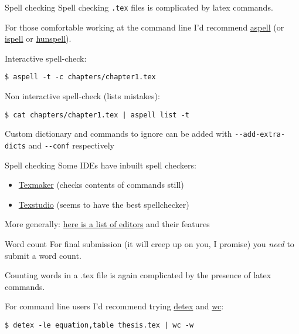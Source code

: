 \begin{frame}[fragile]{Spell checking}
  Spell checking \texttt{.tex} files is complicated by latex commands.

  For those comfortable working at the command line I'd recommend
  \href{http://aspell.net/}{aspell} 
  (or \href{https://www.gnu.org/software/ispell/}{ispell}
  or \href{http://hunspell.github.io/}{hunspell}).

  Interactive spell-check:
  \begin{lstlisting}
$ aspell -t -c chapters/chapter1.tex
  \end{lstlisting}
  Non interactive spell-check (lists mistakes):
  \begin{lstlisting}
$ cat chapters/chapter1.tex | aspell list -t
  \end{lstlisting}%
  Custom dictionary and commands to ignore can be added with
  \lstinline|--add-extra-dicts| and \lstinline|--conf| respectively
\end{frame}

\begin{frame}[fragile]{Spell checking}
  Some IDEs have inbuilt spell checkers:
  \begin{itemize}
    \item \href{http://www.xm1math.net/texmaker/}{Texmaker}
  	  (checks contents of commands still)
    \item \href{https://www.texstudio.org/}{Texstudio} (seems to have the best
  	   spellchecker)
  \end{itemize}
  More generally:
  \href{https://tex.stackexchange.com/questions/339/latex-editors-ides}%
  {here is a list of editors} and their features
\end{frame}

\begin{frame}[fragile]{Word count}
  For final submission (it will creep up on you, I promise) you \textsl{need}
  to submit a word count.

  Counting words in a .tex file is again complicated by the presence of latex
  commands.

  For command line users I'd recommend trying
  \href{https://www.freebsd.org/cgi/man.cgi?query=detex}{detex} and 
  \href{http://pubs.opengroup.org/onlinepubs/9699919799/utilities/wc.html}{wc}:
  \begin{lstlisting}
$ detex -le equation,table thesis.tex | wc -w
  \end{lstlisting}
\end{frame}

